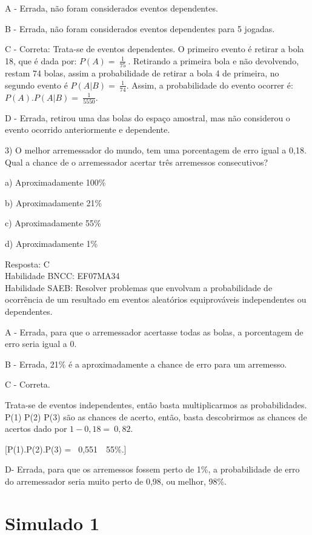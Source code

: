 A - Errada, não foram considerados eventos dependentes.

B - Errada, não foram considerados eventos dependentes para 5 jogadas.

C - Correta: Trata-se de eventos dependentes. O primeiro evento é
retirar a bola 18, que é dada por: \(P(A) = \ \frac{1}{75}\ \).
Retirando a primeira bola e não devolvendo, restam 74 bolas, assim a
probabilidade de retirar a bola 4 de primeira, no segundo evento é
\(P(A|B) = \ \frac{1}{74}\). Assim, a probabilidade do evento ocorrer é:
\(P(A).P(A|B) = \ \frac{1}{5550}\).

D - Errada, retirou uma das bolas do espaço amostral, mas não considerou
o evento ocorrido anteriormente e dependente.

3) O melhor arremessador do mundo, tem uma porcentagem de erro igual a
0,18. Qual a chance de o arremessador acertar três arremessos
consecutivos?

a) Aproximadamente 100\%

b) Aproximadamente 21\%

c) Aproximadamente 55\%

d) Aproximadamente 1\%

Resposta: C\\
Habilidade BNCC: EF07MA34\\
Habilidade SAEB: Resolver problemas que envolvam a probabilidade de
ocorrência de um resultado em eventos aleatórios equiprováveis
independentes ou dependentes.

A - Errada, para que o arremessador acertasse todas as bolas, a
porcentagem de erro seria igual a 0.

B - Errada, 21\% é a aproximadamente a chance de erro para um arremesso.

C - Correta.

Trata-se de eventos independentes, então basta multiplicarmos as
probabilidades. P(1) P(2) P(3) são as chances de acerto, então, basta
descobrirmos as chances de acertos dado por \(1 - 0,18 = \ 0,82.\)

[P(1).P(2).P(3) = \ 0,551\ \ 55\%.]

D- Errada, para que os arremessos fossem perto de 1\%, a probabilidade
de erro do arremessador seria muito perto de 0,98, ou melhor, 98\%.

\section{Simulado 1}

